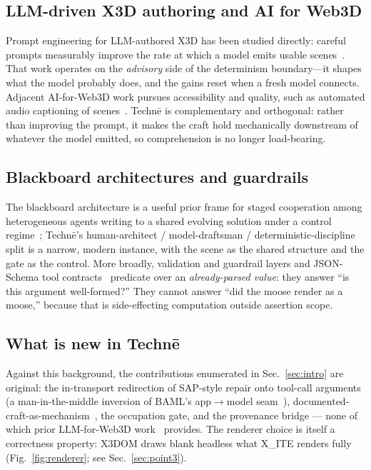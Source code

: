 \documentclass[sigconf,nonacm,screen,anonymous]{acmart}
\begin{document}
\subsection{LLM-driven X3D authoring and AI for Web3D}
Prompt engineering for LLM-authored X3D has been studied directly: careful prompts measurably improve the rate at which a model emits usable scenes~\cite{prompteng}. That work operates on the \emph{advisory} side of the determinism boundary---it shapes what the model probably does, and the gains reset when a fresh model connects. Adjacent AI-for-Web3D work pursues accessibility and quality, such as automated audio captioning of scenes~\cite{audiocaption}. Technē is complementary and orthogonal: rather than improving the prompt, it makes the craft hold mechanically downstream of whatever the model emitted, so comprehension is no longer load-bearing.

\subsection{Blackboard architectures and guardrails}
The blackboard architecture is a useful prior frame for staged cooperation among heterogeneous agents writing to a shared evolving solution under a control regime~\cite{blackboard}; Technē's human-architect / model-draftsman / deterministic-discipline split is a narrow, modern instance, with the scene as the shared structure and the gate as the control. More broadly, validation and guardrail layers and JSON-Schema tool contracts~\cite{jsonschema} predicate over an \emph{already-parsed value}: they answer ``is this argument well-formed?'' They cannot answer ``did the moose render as a moose,'' because that is side-effecting computation outside assertion scope.

\subsection{What is new in Technē}
Against this background, the contributions enumerated in Sec.~\ref{sec:intro} are original: the in-transport redirection of SAP-style repair onto tool-call arguments (a man-in-the-middle inversion of BAML's app$\rightarrow$model seam~\cite{baml,mcp}), documented-craft-as-mechanism~\cite{x3dpy}, the occupation gate, and the provenance bridge --- none of which prior LLM-for-Web3D work~\cite{prompteng} provides. The renderer choice is itself a correctness property: X3DOM draws blank headless what X\_ITE renders fully (Fig.~\ref{fig:renderer}; see Sec.~\ref{sec:point3}).
\end{document}

